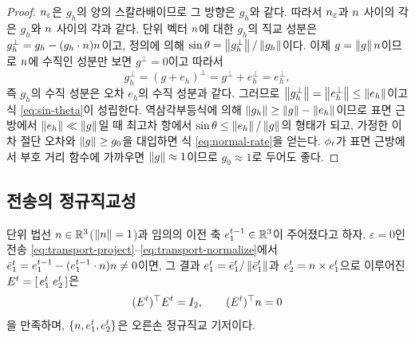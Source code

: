 \begin{proof}
$n_\varepsilon$은 $g_h$의 양의 스칼라배이므로 그 방향은 $g_h$와 같다. 따라서
$n_\varepsilon$과 $n$ 사이의 각은 $g_h$와 $n$ 사이의 각과 같다. 단위 벡터
$n$에 대한 $g_h$의 직교 성분은 $g_h^\perp = g_h - (g_h\cdot n)n$이고, 정의에
의해 $\sin\theta = \left\lVert g_h^\perp \right\rVert/\left\lVert g_h \right\rVert$이다. 이제 $g = \left\lVert g \right\rVert n$이므로
$n$에 수직인 성분만 보면 $g^\perp=0$이고 따라서
\[
  g_h^\perp = (g+e_h)^\perp = g^\perp + e_h^\perp = e_h^\perp,
\]
즉 $g_h$의 수직 성분은 오차 $e_h$의 수직 성분과 같다. 그러므로
$\left\lVert g_h^\perp \right\rVert = \left\lVert e_h^\perp \right\rVert \le \left\lVert e_h \right\rVert$이고 식 \eqref{eq:sin-theta}이
성립한다. 역삼각부등식에 의해 $\left\lVert g_h \right\rVert\ge\left\lVert g \right\rVert-\left\lVert e_h \right\rVert$이므로 표면 근방에서
$\left\lVert e_h \right\rVert\ll\left\lVert g \right\rVert$일 때 최고차 항에서 $\sin\theta \le \left\lVert e_h \right\rVert/\left\lVert g \right\rVert$의
형태가 되고, 가정한 이차 절단 오차와 $\left\lVert g \right\rVert\ge g_0$을 대입하면 식
\eqref{eq:normal-rate}을 얻는다. $\phi_t$가 표면 근방에서 부호 거리 함수에 가까우면
$\left\lVert g \right\rVert\approx1$이므로 $g_0\approx1$로 두어도 좋다.
\end{proof}


\subsection{전송의 정규직교성}

\begin{lemma}
\label{lem:transport-orthonormal}
단위 법선 $n\in\mathbb{R}^3$($\left\lVert n \right\rVert=1$)과 임의의 이전 축
$e^{t-1}_1\in\mathbb{R}^3$이 주어졌다고 하자. $\varepsilon=0$인 전송
\eqref{eq:transport-project}--\eqref{eq:transport-normalize}에서
$\bar e^t_1 = e^{t-1}_1 - (e^{t-1}_1\cdot n)n \ne 0$이면, 그 결과
$e^t_1 = \bar e^t_1/\left\lVert \bar e^t_1 \right\rVert$과 $e^t_2 = n\times e^t_1$으로 이루어진
$E^t = [\,e^t_1\;e^t_2\,]$은
\begin{equation}
  (E^t)^{\top}E^t = I_2, \qquad (E^t)^{\top}n = 0
  \label{eq:orthonormal}
\end{equation}
을 만족하며, $\{n, e^t_1, e^t_2\}$은 오른손 정규직교 기저이다.
\end{lemma}

